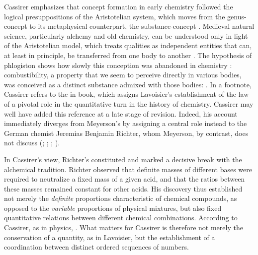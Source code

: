 \documentclass[submitted,12pt]{article}
\begin{document}
Cassirer emphasizes that concept formation in early chemistry followed the logical presuppositions of the Aristotelian system, which moves from the genus-concept  to its metaphysical counterpart, the substance-concept \origg{\SB}. Medieval natural science, particularly alchemy and old chemistry, can be understood only in light of the Aristotelian model, which treats qualities as independent entities that can, at least in principle, be transferred from one body to another . The hypothesis of phlogiston shows how slowly this conception was abandoned in chemistry : combustibility, a property that we seem to perceive directly in various bodies, was conceived as a distinct substance admixed with those bodies:  . In a footnote, Cassirer refers to the  in  book, which assigns Lavoisier's establishment of the law of  a pivotal role in the quantitative turn in the history of chemistry. Cassirer may well have added this reference at a late stage of revision. Indeed, his account immediately diverges from Meyerson's by assigning a central role instead to the German chemist Jeremias Benjamin Richter, whom Meyerson, by contrast, does not discuss (\cite[see][II.III]{Duhem1902}; \cite[lect.~4]{Ladenburg1902}; \cite[I.I]{Wurtz1879}; \cite[44--49]{Ostwald1906Leitlinien}). 

In Cassirer's view, Richter's  constituted   and marked a decisive break with the alchemical tradition. Richter observed that definite masses of different bases were required to neutralize a fixed mass of a given acid, and that the ratios between these masses remained constant for other acids. His discovery thus established not merely the \emph{definite} proportions characteristic of chemical compounds, as opposed to the \emph{variable} proportions of physical mixtures, but also fixed quantitative relations between different chemical combinations. According to Cassirer, as in physics,  . What matters for Cassirer is therefore not merely the conservation  of a quantity, as in Lavoisier, but the establishment of a coordination  between distinct ordered sequences of numbers.
\end{document}
